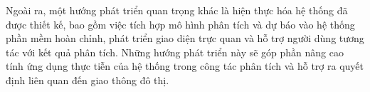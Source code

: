 Ngoài ra, một hướng phát triển quan trọng khác là hiện thực hóa hệ thống đã được thiết kế, bao gồm việc tích hợp mô hình phân tích và dự báo vào hệ thống phần mềm hoàn chỉnh, phát triển giao diện trực quan và hỗ trợ người dùng tương tác với kết quả phân tích. Những hướng phát triển này sẽ góp phần nâng cao tính ứng dụng thực tiễn của hệ thống trong công tác phân tích và hỗ trợ ra quyết định liên quan đến giao thông đô thị.
